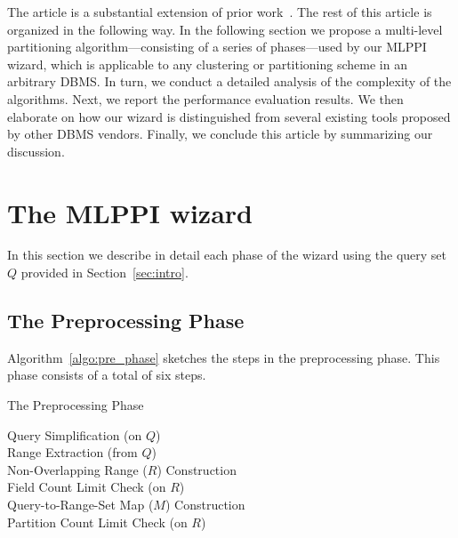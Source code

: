 \documentclass[runningheads]{comsis2}
\begin{document}
The article is a substantial extension of prior work~\cite{Suh12}. 
The rest of this article is \hbox{organized} in the following way. 
In the following section we propose a \hbox{multi-level} partitioning algorithm---consisting of a series of phases---used by our MLPPI wizard, 
which is applicable to any clustering or partitioning scheme in an arbitrary DBMS. 
In turn, we conduct a detailed analysis of the complexity of the algorithms. 
Next, we report the performance evaluation results. 
We then elaborate on how our wizard is distinguished from several existing tools proposed by other DBMS vendors. 
Finally, we conclude this article by summarizing our discussion.

\section{The MLPPI wizard}
\label{sec:algorithms}

In this section we describe in detail each phase of the wizard using the query set $Q$ \hbox{provided} in Section~\ref{sec:intro}. 

\subsection{The Preprocessing Phase}
\label{sec:pre_phase}

Algorithm~\ref{algo:pre_phase} sketches 
the steps in the preprocessing phase. 
This phase consists of a total of six steps. 

\vspace{-.1in}

\begin{algorithm}	
\caption{The Preprocessing Phase}
\label{algo:pre_phase}
{
\hspace{.05in} Query Simplification (on $Q$)\\
\hspace{.05in} Range Extraction (from $Q$) \\
\hspace{.05in} Non-Overlapping Range ($R$) Construction \\
\hspace{.05in} Field Count Limit Check (on $R$) \\
\hspace{.05in} Query-to-Range-Set Map ($M$) Construction \\
\hspace{.05in} Partition Count Limit Check (on $R$) \\
}
\end{algorithm}
\end{document}
